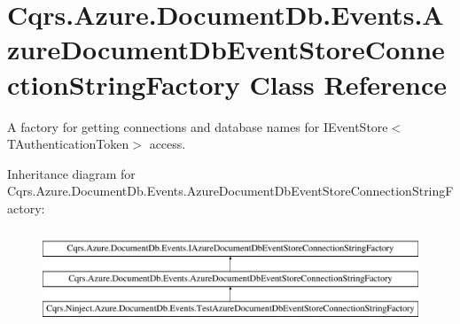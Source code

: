 \hypertarget{classCqrs_1_1Azure_1_1DocumentDb_1_1Events_1_1AzureDocumentDbEventStoreConnectionStringFactory}{}\section{Cqrs.\+Azure.\+Document\+Db.\+Events.\+Azure\+Document\+Db\+Event\+Store\+Connection\+String\+Factory Class Reference}
\label{classCqrs_1_1Azure_1_1DocumentDb_1_1Events_1_1AzureDocumentDbEventStoreConnectionStringFactory}


A factory for getting connections and database names for I\+Event\+Store$<$\+T\+Authentication\+Token$>$ access.  


Inheritance diagram for Cqrs.\+Azure.\+Document\+Db.\+Events.\+Azure\+Document\+Db\+Event\+Store\+Connection\+String\+Factory\+:\begin{figure}[H]
\begin{center}
\leavevmode
\includegraphics[height=2.891566cm]{classCqrs_1_1Azure_1_1DocumentDb_1_1Events_1_1AzureDocumentDbEventStoreConnectionStringFactory}
\end{center}
\end{figure}
